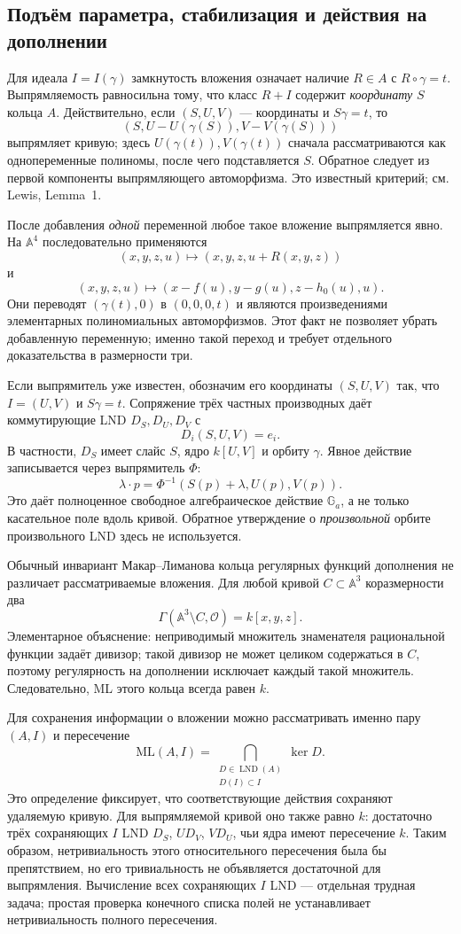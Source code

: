 \subsection{Подъём параметра, стабилизация и действия на дополнении}

Для идеала $I=I(\gamma)$ замкнутость вложения означает наличие
$R\in A$ с $R\circ\gamma=t$. Выпрямляемость равносильна тому, что класс
$R+I$ содержит \emph{координату} $S$ кольца $A$. Действительно, если
$(S,U,V)$ --- координаты и $S\gamma=t$, то
\[
 (S,U-U(\gamma(S)),V-V(\gamma(S)))
\]
выпрямляет кривую; здесь $U(\gamma(t)),V(\gamma(t))$ сначала рассматриваются
как однопеременные полиномы, после чего подставляется $S$.
Обратное следует из первой компоненты выпрямляющего автоморфизма.
Это известный критерий; см. Lewis, Lemma~1.

После добавления \emph{одной} переменной любое такое вложение
выпрямляется явно. На $\mathbb A^4$ последовательно применяются
\[
 (x,y,z,u)\longmapsto(x,y,z,u+R(x,y,z))
\]
и
\[
 (x,y,z,u)\longmapsto(x-f(u),y-g(u),z-h_0(u),u).
\]
Они переводят $(\gamma(t),0)$ в $(0,0,0,t)$ и являются произведениями
элементарных полиномиальных автоморфизмов. Этот факт не позволяет убрать
добавленную переменную; именно такой переход и требует отдельного
доказательства в размерности три.

Если выпрямитель уже известен, обозначим его координаты $(S,U,V)$ так,
что $I=(U,V)$ и $S\gamma=t$. Сопряжение трёх частных производных даёт
коммутирующие LND $D_S,D_U,D_V$ с
\[
 D_i(S,U,V)=e_i.
\]
В частности, $D_S$ имеет слайс $S$, ядро $k[U,V]$ и орбиту $\gamma$.
Явное действие записывается через выпрямитель $\Phi$:
\[
 \lambda\cdot p=\Phi^{-1}(S(p)+\lambda,U(p),V(p)).
\]
Это даёт полноценное свободное алгебраическое действие $\mathbb G_a$,
а не только касательное поле вдоль кривой. Обратное утверждение о
\emph{произвольной} орбите произвольного LND здесь не используется.

Обычный инвариант Макар--Лиманова кольца регулярных функций дополнения
не различает рассматриваемые вложения. Для любой кривой
$C\subset\mathbb A^3$ коразмерности два
\[
 \Gamma(\mathbb A^3\setminus C,\mathcal O)=k[x,y,z].
\]
Элементарное объяснение: неприводимый множитель знаменателя рациональной
функции задаёт дивизор; такой дивизор не может целиком содержаться в $C$,
поэтому регулярность на дополнении исключает каждый такой множитель.
Следовательно, ML этого кольца всегда равен $k$.

Для сохранения информации о вложении можно рассматривать именно пару
$(A,I)$ и пересечение
\[
 \mathrm{ML}(A,I)=
 \bigcap_{\substack{D\in\operatorname{LND}(A)\\D(I)\subset I}}\ker D.
\]
Это определение фиксирует, что соответствующие действия сохраняют
удаляемую кривую. Для выпрямляемой кривой оно также равно $k$:
достаточно трёх сохраняющих $I$ LND
$D_S$, $U D_V$, $V D_U$, чьи ядра имеют пересечение $k$.
Таким образом, нетривиальность этого относительного пересечения была
бы препятствием, но его тривиальность не объявляется достаточной для
выпрямления. Вычисление всех сохраняющих $I$ LND --- отдельная трудная
задача; простая проверка конечного списка полей не устанавливает
нетривиальность полного пересечения.

